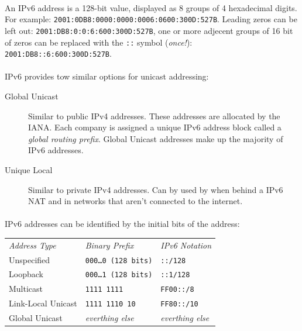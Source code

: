 \documentclass[10pt,landscape]{article}
\begin{document}
\begin{multicols}{3}
\paragraph{}
An IPv6 address is a 128-bit value, displayed as 8 groups of 4 hexadecimal digits.
For example: \verb!2001:0DB8:0000:0000:0006:0600:300D:527B!.
Leading zeros can be left out: \verb!2001:DB8:0:0:6:600:300D:527B!, one or more adjecent groups
of 16 bit of zeros can be replaced with the \verb!::! symbol (\textit{once!}): \verb!2001:DB8::6:600:300D:527B!.
\paragraph{}
IPv6 provides tow similar options for unicast addressing:
\begin{description}
	\item[Global Unicast] Similar to public IPv4 addresses. These addresses are allocated by the IANA. Each company is assigned a unique IPv6 address block called a \textit{global routing prefix}. Global Unicast addresses make up the majority of IPv6 addresses.
	\item[Unique Local] Similar to private IPv4 addresses. Can by used by when behind a IPv6 NAT and in networks that aren't connected to the internet.
\end{description}
\paragraph{}
IPv6 addresses can be identified by the initial bits of the address:
\begin{tabular}{@{}l@{}l@{}l@{}}
\textit{Address Type} & \textit{Binary Prefix} & \textit{IPv6 Notation} \\
Unspecified                       & %
        \verb!000…0 (128 bits)!   & %
        \verb!::/128!             \\
Loopback                          & %
        \verb!000…1 (128 bits)!   & %
        \verb!::1/128!            \\
Multicast                         & %
        \verb!1111 1111!          & %
        \verb!FF00::/8!           \\
Link-Local Unicast                & %
        \verb!1111 1110 10!       & %
        \verb!FF80::/10!          \\
Global Unicast                    & %
        \textit{everthing else}   & %
        \textit{everthing else}
\end{tabular}


\end{multicols}
\end{document}
